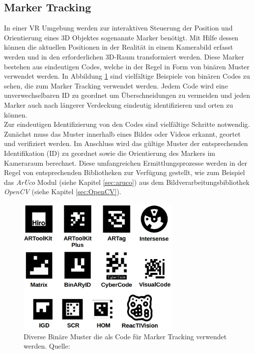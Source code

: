 \subsection{Marker Tracking} \label{sec:MarkerTracking}
In einer VR Umgebung werden zur interaktiven Steuerung der Position und Orientierung eines 3D Objektes sogenannte Marker benötigt. Mit Hilfe dessen können die aktuellen Positionen in der Realität in einem Kamerabild erfasst werden und in den erforderlichen 3D-Raum transformiert werden. Diese Marker bestehen aus eindeutigen Codes, welche in der Regel in Form von binären Muster verwendet werden. In Abbildung \ref{fig:BinMarker} sind vielfältige Beispiele von binären Codes zu sehen, die zum Marker Tracking verwendet werden. Jedem Code wird eine unverwechselbaren ID zu geordnet um Überschneidungen zu vermeiden und jeden Marker auch nach längerer Verdeckung eindeutig identifizieren und orten zu können.\\
Zur eindeutigen Identifizierung von den Codes sind vielfältige Schritte notwendig. Zunächst muss das Muster innerhalb eines Bildes oder Videos erkannt, geortet und verifiziert werden. Im Anschluss wird das gültige Muster der entsprechenden Identifikation (ID) zu geordnet sowie die Orientierung des Markers im Kameraraum berechnet. Diese umfangreichen Ermittlungsprozesse werden in der Regel von entsprechenden Bibliotheken zur Verfügung gestellt, wie zum Beispiel das \textit{ArUco} Modul (siehe Kapitel \ref{sec:aruco}) aus dem Bildverarbeitungsbibliothek \textit{OpenCV} (siehe Kapitel \ref{sec:OpenCV}). \\
\begin{figure}[H] 
	\center 
	\includegraphics[width=8cm]{Bilder/BinMuster.jpg}			
	\caption{Diverse Binäre Muster die als Code für Marker Tracking verwendet werden. Quelle: \cite{article:Aruco2014}}
	\label{fig:BinMarker}
\end{figure}
